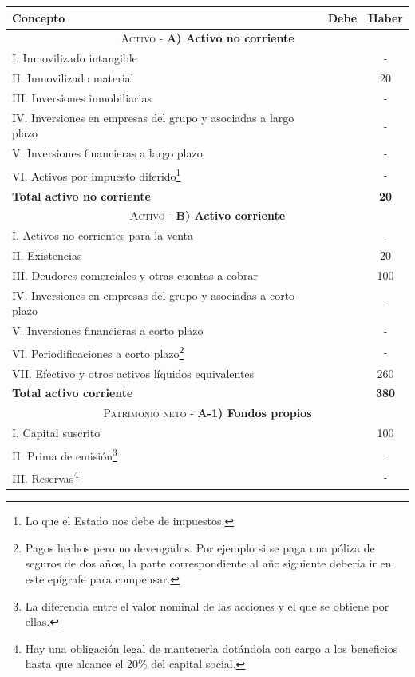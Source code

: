 \documentclass[nochap,palatino,notitlepage]{apuntes}
\begin{document}
\begin{table}[hbtp]
\begin{minipage}{\textwidth}
\footnotesize
\centering
\begin{tabular}{l|c|c}
\textbf{Concepto} & \textbf{Debe} & \textbf{Haber} \\ \toprule
\multicolumn{3}{c}{\textsc{Activo} - \textbf{A) Activo no corriente}} \\ \midrule
I. Inmovilizado intangible & & - \\
II. Inmovilizado material & & 20 \\
III. Inversiones inmobiliarias & & - \\
IV. Inversiones en empresas del grupo y asociadas a largo plazo & & - \\
V. Inversiones financieras a largo plazo & & - \\
VI. Activos por impuesto diferido\footnote{Lo que el Estado nos debe de impuestos.} & & - \\
\textbf{Total activo no corriente} & & \textbf{20} \\ \midrule
\multicolumn{3}{c}{\textsc{Activo} - \textbf{B) Activo corriente}} \\ \midrule
I. Activos no corrientes para la venta & & - \\
II. Existencias & & 20 \\
III. Deudores comerciales y otras cuentas a cobrar & & 100 \\
IV. Inversiones en empresas del grupo y asociadas a corto plazo & & - \\
V. Inversiones financieras a corto plazo & & - \\
VI. Periodificaciones a corto plazo\footnote{Pagos hechos pero no devengados. Por ejemplo si se paga una póliza de seguros de dos años, la parte correspondiente al año siguiente debería ir en este epígrafe para compensar.} & & - \\
VII. Efectivo y otros activos líquidos equivalentes & & 260 \\
\textbf{Total activo corriente} & & \textbf{380} \\ \midrule
\multicolumn{3}{c}{\textsc{Patrimonio neto} - \textbf{A-1) Fondos propios}} \\ \midrule
I. Capital suscrito & & 100 \\
II. Prima de emisión\footnote{La diferencia entre el valor nominal de las acciones y el que se obtiene por ellas.} & & - \\
III. Reservas\footnote{Hay una obligación legal de mantenerla dotándola con cargo a los beneficios hasta que alcance el 20\% del capital social.} & & - \\

\end{tabular}
\end{minipage}
\end{table}
\end{document}
